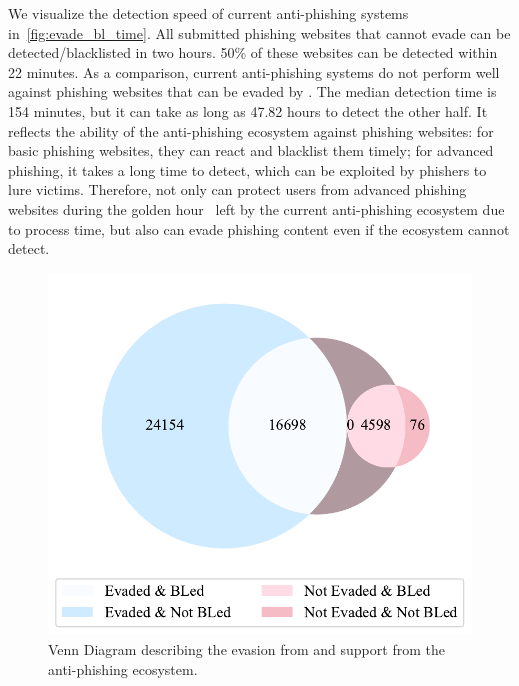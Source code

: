We visualize the detection speed of current anti-phishing systems in~\autoref{fig:evade_bl_time}.
All submitted phishing websites that \spartacus cannot evade can be detected/blacklisted in two hours.
50\% of these websites can be detected within 22 minutes.
As a comparison, current anti-phishing systems do not perform well against phishing websites that can be evaded by \spartacus.
The median detection time is 154 minutes, but it can take as long as 47.82 hours to detect the other half.
It reflects the ability of the anti-phishing ecosystem against phishing websites: 
for basic phishing websites, they can react and blacklist them timely;
for advanced phishing, it takes a long time to detect, which can be exploited by phishers to lure victims.
Therefore, \spartacus not only can protect users from advanced phishing websites during the golden hour~\cite{oest2020sunrise} left by the current anti-phishing ecosystem due to process time, but also can evade phishing content even if the ecosystem cannot detect.


\begin{figure}
\centering
\includegraphics[width=\linewidth]{figs/venn_eval_3.pdf}
\caption{Venn Diagram describing the evasion from \spartacus and support from the anti-phishing ecosystem.}
\label{fig:venn_support}
\end{figure}

